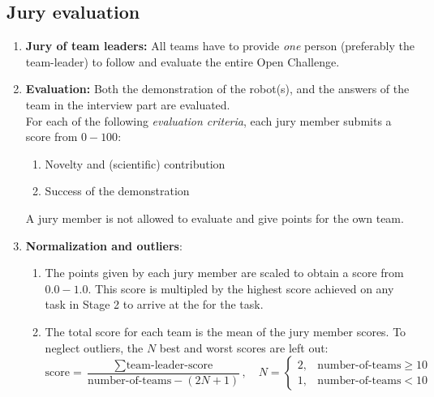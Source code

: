 \OpenDemonstrationChanges

\subsection{Jury evaluation}
\begin{enumerate}
  \item \textbf{Jury of team leaders:} All teams have to provide \emph{one} person 
  (preferably the team-leader) to follow and evaluate the entire Open Challenge.
  \item \textbf{Evaluation:} Both the demonstration of the robot(s), and the answers of the team in the interview part are evaluated.\\ 
  For each of the following \emph{evaluation criteria}, each jury member submits a score from $0-100$:
  \begin{enumerate}
  \item Novelty and (scientific) contribution
  \item Success of the demonstration 
  \end{enumerate}
  A jury member is not allowed to evaluate and give points for the own team.
  \item \textbf{Normalization and outliers}: 
  \begin{enumerate}
    \item The points given by each jury member are scaled to obtain a score from $0.0-1.0$. This score is multipled by the highest score achieved on any task in Stage 2 to arrive at the  for the task. 
    \item The total score for each team is the mean of the jury member scores.
      To neglect outliers, the $N$ best and worst scores are left out:
      $$\mbox{score} = \frac{\sum\mbox{team-leader-score}}{\mbox{number-of-teams} - (2N+1)},
      \quad N=\begin{cases}2, & \mbox{number-of-teams} \ge 10\\1, & \mbox{number-of-teams} < 10 \end{cases}$$
    \end{enumerate}
\end{enumerate}

